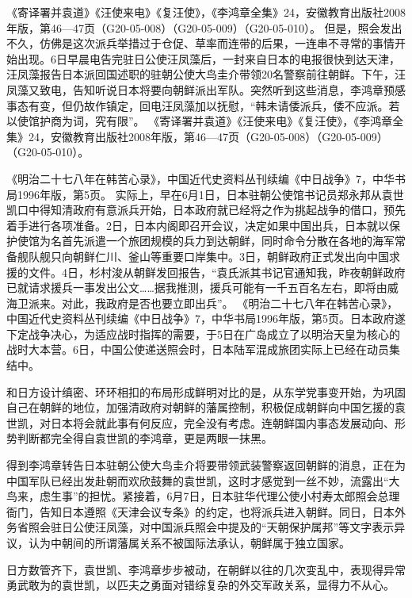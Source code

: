 \documentclass[12pt,UTF8]{ctexbook}
\begin{document}
《寄译署并袁道》《汪使来电》《复汪使》，《李鸿章全集》24，安徽教育出版社2008年版，第46—47页（G20-05-008）（G20-05-009）（G20-05-010）。
但是，照会发出不久，仿佛是这次派兵举措过于仓促、草率而连带的后果，一连串不寻常的事情开始出现。6日早晨电告完驻日公使汪凤藻后，一封来自日本的电报很快到达天津，汪凤藻报告日本派回国述职的驻朝公使大鸟圭介带领20名警察前往朝鲜。下午，汪凤藻又致电，告知听说日本将要向朝鲜派出军队。突然听到这些消息，李鸿章预感事态有变，但仍故作镇定，回电汪凤藻加以抚慰，“韩未请倭派兵，倭不应派。若以使馆护商为词，究有限”。 《寄译署并袁道》《汪使来电》《复汪使》，《李鸿章全集》24，安徽教育出版社2008年版，第46—47页（G20-05-008）（G20-05-009）（G20-05-010）。

《明治二十七八年在韩苦心录》，中国近代史资料丛刊续编《中日战争》7，中华书局1996年版，第5页。
实际上，早在6月1日，日本驻朝公使馆书记员郑永邦从袁世凯口中得知清政府有意派兵开始，日本政府就已经将之作为挑起战争的借口，预先着手进行各项准备。2日，日本内阁即召开会议，决定如果中国出兵，日本就以保护使馆为名首先派遣一个旅团规模的兵力到达朝鲜，同时命令分散在各地的海军常备舰队舰只向朝鲜仁川、釜山等重要口岸集中。3日，朝鲜政府正式发出向中国求援的文件。4日，杉村浚从朝鲜发回报告，“袁氏派其书记官通知我，昨夜朝鲜政府已就请求援兵一事发出公文……据我推测，援兵可能有一千五百名左右，即将由威海卫派来。对此，我政府是否也要立即出兵”。 《明治二十七八年在韩苦心录》，中国近代史资料丛刊续编《中日战争》7，中华书局1996年版，第5页。日本政府遂下定战争决心，为适应战时指挥的需要，于5日在广岛成立了以明治天皇为核心的战时大本营。6日，中国公使递送照会时，日本陆军混成旅团实际上已经在动员集结中。

和日方设计缜密、环环相扣的布局形成鲜明对比的是，从东学党事变开始，为巩固自己在朝鲜的地位，加强清政府对朝鲜的藩属控制，积极促成朝鲜向中国乞援的袁世凯，对日本将会就此事有何反应，完全没有考虑。连朝鲜国内事态发展动向、形势判断都完全得自袁世凯的李鸿章，更是两眼一抹黑。

得到李鸿章转告日本驻朝公使大鸟圭介将要带领武装警察返回朝鲜的消息，正在为中国军队已经出发赴朝而欢欣鼓舞的袁世凯，这时才感觉到一丝不妙，流露出“大鸟来，虑生事”的担忧。紧接着，6月7日，日本驻华代理公使小村寿太郎照会总理衙门，告知日本遵照《天津会议专条》的约定，也将派兵进入朝鲜。同日，日本外务省照会驻日公使汪凤藻，对中国派兵照会中提及的“天朝保护属邦”等文字表示异议，认为中朝间的所谓藩属关系不被国际法承认，朝鲜属于独立国家。

日方数管齐下，袁世凯、李鸿章步步被动，在朝鲜以往的几次变乱中，表现得异常勇武敢为的袁世凯，以匹夫之勇面对错综复杂的外交军政关系，显得力不从心。
\end{document}
